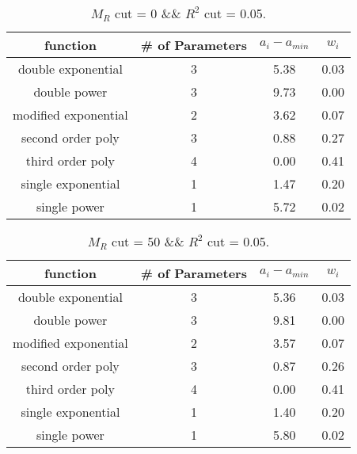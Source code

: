  
\begin{table}[H] 
\begin{center} 
\begin{tabular}{|c|c|c|c|} 
\hline function & \# of Parameters & $a_i-a_{min}$ & $w_i$ \\ \hline 
double exponential &  3 &   5.38 &   0.03 \\ 
double power &  3 &   9.73 &   0.00 \\ 
modified exponential &  2 &   3.62 &   0.07 \\ 
second order poly &  3 &   0.88 &   0.27 \\ 
third order poly &  4 &   0.00 &   0.41 \\ 
single exponential &  1 &   1.47 &   0.20 \\ 
single power &  1 &   5.72 &   0.02 \\ 
\hline 
\end{tabular} 
\caption{$M_R$ cut = 0 \&\& $R^2$ cut = 0.05.} 
\label{tab:FitChoices_0_0.05} 
\end{center} 
\end{table} 
 
 
\begin{table}[H] 
\begin{center} 
\begin{tabular}{|c|c|c|c|} 
\hline function & \# of Parameters & $a_i-a_{min}$ & $w_i$ \\ \hline 
double exponential &  3 &   5.36 &   0.03 \\ 
double power &  3 &   9.81 &   0.00 \\ 
modified exponential &  2 &   3.57 &   0.07 \\ 
second order poly &  3 &   0.87 &   0.26 \\ 
third order poly &  4 &   0.00 &   0.41 \\ 
single exponential &  1 &   1.40 &   0.20 \\ 
single power &  1 &   5.80 &   0.02 \\ 
\hline 
\end{tabular} 
\caption{$M_R$ cut = 50 \&\& $R^2$ cut = 0.05.} 
\label{tab:FitChoices_50_0.05} 
\end{center} 
\end{table} 
 
